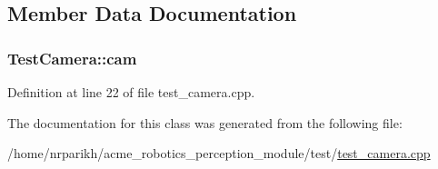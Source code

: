 \subsection{Member Data Documentation}
\subsubsection[{\texorpdfstring{cam}{cam}}]{ Test\+Camera\+::cam\hspace{0.3cm}{\ttfamily [protected]}}\hypertarget{class_test_camera_ac1abc17c2f7f776456583bc3a60db3a9}{}\label{class_test_camera_ac1abc17c2f7f776456583bc3a60db3a9}


Definition at line 22 of file test\+\_\+camera.\+cpp.



The documentation for this class was generated from the following file\+:\begin{DoxyCompactItemize}
\item 
/home/nrparikh/acme\+\_\+robotics\+\_\+perception\+\_\+module/test/\hyperlink{test__camera_8cpp}{test\+\_\+camera.\+cpp}\end{DoxyCompactItemize}
